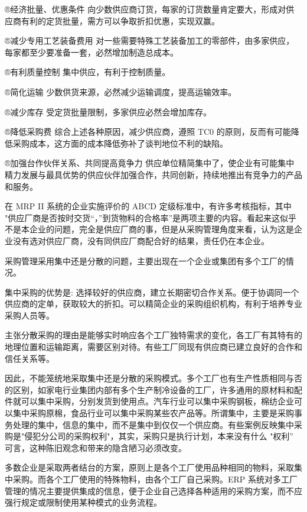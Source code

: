     ®经济批量、优惠条件 向少数供应商订货，每家的订货数量肯定要大，形成对供应商有利的定货批量，需方可以争取折扣优惠，实现双赢。

    ®减少专用工艺装备费用 对一些需要特殊工艺装备加工的零部件，由多家供应，每家都至少要准备一套，必然增加制造总成本。

    ®有利质量控制 集中供应，有利于控制质量。

    ®简化运输 少数供货来源，必然减少运输调度，提高运输效率。

    ®减少库存 受定货批量限制，多家供应必然会增加库存。

    ®降低采购费 综合上述各种原因，减少供应商，遵照 TC0 的原则，反而有可能降低采购成本，这方面的成本降低弥补了谈判地位不利的缺陷。

    ®加强台作伙伴关系、共同提高竟争力 供应单位精简集中了，使企业有可能集中精力发展与最具优势的供应伙伴加强合作，共同创新，持续地推出有竞争力的产品和服务。

    在 MRP II 系统的企业实施评价的 ABCD 定级标准中，有许多考核指标，其中 "供应厂商是否按时交货“，”到货物料的合格率”是两项主要的内容。看起来这似乎不是本企业的问题，完全是供应厂商的事，但是从采购管理角度来看，认为这是企业没有选对供应厂商，没有同供应厂商配合好的结果，责任仍在本企业。

    采购管理采用集中还是分散的问题，主要出现在一个企业或集团有多个工厂的情况。

    集中采购的优势是: 选择较好的供应商，建立长期密切合作关系。便于协调同一个供应商的定单，获取较大的折扣。可以精简企业的采购组织机构，有利于培养专业采购人员等。

    主张分散采购的理由是能够实时响应各个工厂独特需求的变化，各工厂有其特有的地理位置和运输距离，需要区别对待。有些工厂同现有供应商已建立良好的合作和信任关系等。

    因此，不能笼统地采取集中还是分散的采购模式。多个工厂也有生产性质相同与否的区别，如家电行业集团内部有多个生产制冷设备的工厂，许多通用的原材料和配件就可以集中采购，分别发货到使用点。汽车行业可以集中采购钢板，棉纺企业可以集中采购原棉，食品行业可以集中采购某些农产品等。所谓集中，主要是采购事务处理的集中，信息的集中，而不是集中到仅仅一个供应商。有些案例反映集中采购是"侵犯分公司的采购权利"，其实，采购只是执行计划，本来没有什么 "权利” 可言，这种陈旧观念和带来的隐含陋习必须改变。

    多数企业是采取两者结台的方案，原则上是各个工厂使用品种相同的物料，采取集中采购。而各个工厂使用的特殊物料，由各个工厂自己采购。ERP 系统对多工厂管理的情况主要提供集成的信息，便于企业自己选择各种适用的采购方案，而不应强行规定或限制使用某种模式的业务流程。
